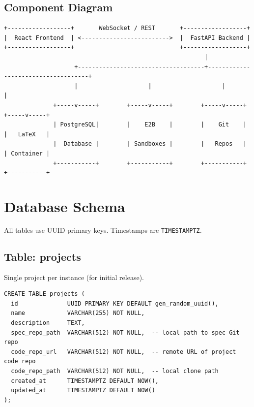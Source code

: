 \documentclass[11pt,a4paper]{article}
\begin{document}
\subsection{Component Diagram}

\begin{verbatim}
+------------------+       WebSocket / REST       +------------------+
|  React Frontend  | <------------------------->  |  FastAPI Backend |
+------------------+                              +------------------+
                                                         |
                    +------------------------------------+------------------------------------+
                    |                    |                    |                    |
              +-----v-----+        +-----v-----+        +-----v-----+        +-----v-----+
              | PostgreSQL|        |    E2B    |        |    Git    |        |   LaTeX   |
              |  Database |        | Sandboxes |        |   Repos   |        | Container |
              +-----------+        +-----------+        +-----------+        +-----------+
\end{verbatim}

\section{Database Schema}

All tables use UUID primary keys. Timestamps are \texttt{TIMESTAMPTZ}.

\subsection{Table: projects}

Single project per instance (for initial release).

\begin{lstlisting}
CREATE TABLE projects (
  id              UUID PRIMARY KEY DEFAULT gen_random_uuid(),
  name            VARCHAR(255) NOT NULL,
  description     TEXT,
  spec_repo_path  VARCHAR(512) NOT NULL,  -- local path to spec Git repo
  code_repo_url   VARCHAR(512) NOT NULL,  -- remote URL of project code repo
  code_repo_path  VARCHAR(512) NOT NULL,  -- local clone path
  created_at      TIMESTAMPTZ DEFAULT NOW(),
  updated_at      TIMESTAMPTZ DEFAULT NOW()
);
\end{lstlisting}
\end{document}
